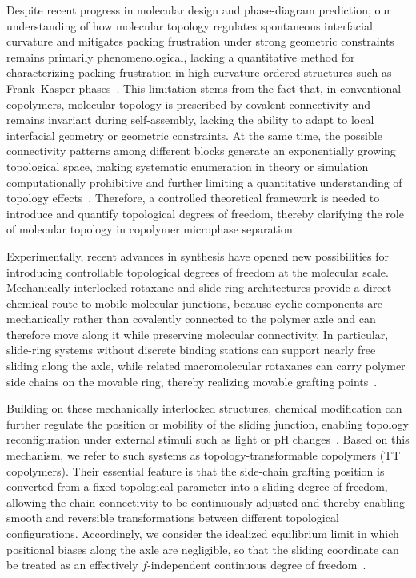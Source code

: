 Despite recent progress in molecular design and phase-diagram prediction, our understanding of how molecular topology regulates spontaneous interfacial curvature and mitigates packing frustration under strong geometric constraints remains primarily phenomenological, lacking a quantitative method for characterizing packing frustration in high-curvature ordered structures such as Frank--Kasper phases~\cite{Xu2024Architectural, Zhao2025Laves}.
This limitation stems from the fact that, in conventional copolymers, molecular topology is prescribed by covalent connectivity and remains invariant during self-assembly, lacking the ability to adapt to local interfacial geometry or geometric constraints.
At the same time, the possible connectivity patterns among different blocks generate an exponentially growing topological space, making systematic enumeration in theory or simulation computationally prohibitive and further limiting a quantitative understanding of topology effects~\cite{Khadilkar2017Inverse, Dong2024Automated, Zhao2025Optimization, Case2021Opensource}.
Therefore, a controlled theoretical framework is needed to introduce and quantify topological degrees of freedom, thereby clarifying the role of molecular topology in copolymer microphase separation.


Experimentally, recent advances in synthesis have opened new possibilities for introducing controllable topological degrees of freedom at the molecular scale.
Mechanically interlocked rotaxane and slide-ring architectures provide a direct chemical route to mobile molecular junctions, because cyclic components are mechanically rather than covalently connected to the polymer axle and can therefore move along it while preserving molecular connectivity.
In particular, slide-ring systems without discrete binding stations can support nearly free sliding along the axle, while related macromolecular rotaxanes can carry polymer side chains on the movable ring, thereby realizing movable grafting points~\cite{Aoki2014Mechanically,Ando2025Recent,Ghiassinejad2024Dynamics,ToshikazuTakata2018Topologytransformable,ToshikazuTakata2019StimuliResponsive,Wei-JianLi2020RotaxaneBranched}.

Building on these mechanically interlocked structures, chemical modification can further regulate the position or mobility of the sliding junction, enabling topology reconfiguration under external stimuli such as light or pH changes~\cite{HirokiSato2021Topologytransformable,ToshikazuTakata2020Switchable,Chak-ShingKwan2020Development,Sun2019Architecturetransformable}.
Based on this mechanism, we refer to such systems as topology-transformable copolymers (TT copolymers).
Their essential feature is that the side-chain grafting position is converted from a fixed topological parameter into a sliding degree of freedom, allowing the chain connectivity to be continuously adjusted and thereby enabling smooth and reversible transformations between different topological configurations.
Accordingly, we consider the idealized equilibrium limit in which positional biases along the axle are negligible, so that the sliding coordinate can be treated as an effectively $f$-independent continuous degree of freedom~\cite{Ando2025Recent, Ghiassinejad2024Dynamics}.

